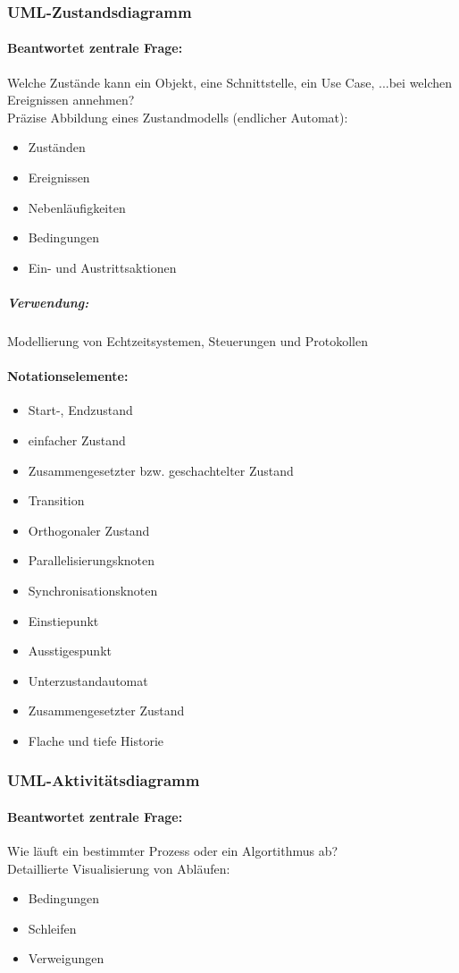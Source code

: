 \documentclass[../ZF_SWEN1.tex]{subfiles}
\begin{document}
\subsubsection{UML-Zustandsdiagramm}
\paragraph{Beantwortet zentrale Frage:\\}
Welche Zustände kann ein Objekt, eine Schnittstelle, ein Use Case, ...bei welchen Ereignissen annehmen?\\
Präzise Abbildung eines Zustandmodells (endlicher Automat):
\begin{itemize}
	\item Zuständen
	\item Ereignissen
	\item Nebenläufigkeiten
	\item Bedingungen
	\item Ein- und Austrittsaktionen
\end{itemize}
\subparagraph{Verwendung:} Modellierung von Echtzeitsystemen, Steuerungen und Protokollen 

\paragraph{Notationselemente:}
\begin{itemize}
	\item Start-, Endzustand
	\item einfacher Zustand
	\item Zusammengesetzter bzw. geschachtelter Zustand
	\item Transition
	\item Orthogonaler Zustand
	\item Parallelisierungsknoten
	\item Synchronisationsknoten
	\item Einstiepunkt
	\item Ausstigespunkt
	\item Unterzustandautomat
	\item Zusammengesetzter Zustand
	\item Flache und tiefe Historie
\end{itemize}


\subsubsection{UML-Aktivitätsdiagramm}
\paragraph{Beantwortet zentrale Frage:\\}
Wie läuft ein bestimmter Prozess oder ein Algortithmus ab?\\
Detaillierte Visualisierung von Abläufen:
\begin{itemize}
	\item Bedingungen
	\item Schleifen
	\item Verweigungen
\end{itemize}
\end{document}
